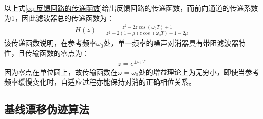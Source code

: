 \documentclass{ctexart}
\begin{document}
				以上式\ref{eq:反馈回路的传递函数}给出反馈回路的传递函数，而前向通道的传递系数为1，因此滤波器总的传递函数为：
				\begin{gather}
					H(z)=\frac{z^{2}-2z\cos(\omega_0T)+1}{z^2-2(1-\mu)z\cos(\omega_0T)+1-2\mu}
				\end{gather}
				该传递函数说明，在参考频率$\omega_0$处，单一频率的噪声对消器具有带阻滤波器特性，且传输函数的零点为：
				\begin{gather}
					z=e^{\pm \omega_0T}
				\end{gather}
				因为零点在单位圆上，故传输函数$在\omega=\omega_0$处的增益理论上为无穷小，即使当参考频率缓慢变化时，自适应过程亦能保持对消的正确相位关系。
		\subsection{基线漂移伪迹算法}
\end{document}

